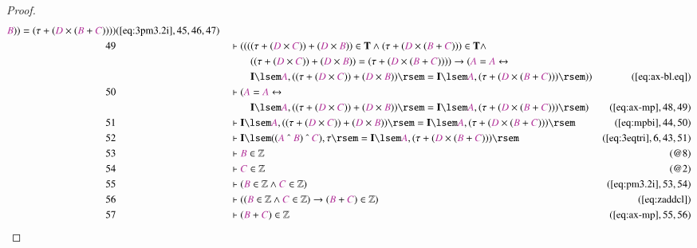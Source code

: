 \begin{proof}
\begin{align}
      \mc{B} ) ) = ( \tau + ( \mc{D} \times ( \mc{B} +
      \mc{C} ) ) )
      )&(\mbox{\ref{eq:3pm3.2i}},45,46,47)\notag
  \\ 49 &&  & \vdash ( ( ( ( \tau + ( \mc{D} \times \mc{C} ) ) + ( \mc{D} \times
      \mc{B} ) ) \in \mathbf{T} \wedge ( \tau + ( \mc{D}
      \times ( \mc{B} + \mc{C} ) ) ) \in \mathbf{T} \wedge  \notag \\ & & & \qquad
      (
      ( \tau + ( \mc{D} \times \mc{C} ) ) + ( \mc{D} \times
      \mc{B} ) ) = ( \tau + ( \mc{D} \times ( \mc{B} +
      \mc{C} ) ) ) ) \rightarrow ( \mc{A} = \mc{A}
      \leftrightarrow \notag \\ & & & \qquad
       \mathbf{I} \lsem \mc{A} , ( ( \tau +
      ( \mc{D} \times \mc{C} ) ) + ( \mc{D} \times \mc{B} ) )
      \rsem = \mathbf{I} \lsem \mc{A} , ( \tau + ( \mc{D}
      \times ( \mc{B} + \mc{C} ) ) ) \rsem )
      )&(\mbox{\ref{eq:ax-bl.eq}})\notag
  \\ 50 &&  & \vdash ( \mc{A} = \mc{A} \leftrightarrow  \notag \\ & & & \qquad
      \mathbf{I} \lsem \mc{A}
      , ( ( \tau + ( \mc{D} \times \mc{C} ) ) + ( \mc{D}
      \times \mc{B} ) ) \rsem = \mathbf{I} \lsem \mc{A} , (
      \tau + ( \mc{D} \times ( \mc{B} + \mc{C} ) ) ) \rsem
      )&(\mbox{\ref{eq:ax-mp}},48,49)\notag
  \\ 51 &&  & \vdash \mathbf{I} \lsem \mc{A} , ( ( \tau + ( \mc{D} \times \mc{C}
      ) ) + ( \mc{D} \times \mc{B} ) ) \rsem = \mathbf{I}
      \lsem \mc{A} , ( \tau + ( \mc{D} \times ( \mc{B} +
      \mc{C} ) ) ) \rsem&(\mbox{\ref{eq:mpbi}},44,50)\notag
  \\ 52 &&  & \vdash \mathbf{I} \lsem ( ( \mc{A} ~\string^~ \mc{B} ) ~\string^~
      \mc{C} ) , \tau \rsem = \mathbf{I} \lsem \mc{A} , (
      \tau + ( \mc{D} \times ( \mc{B} + \mc{C} ) ) )
      \rsem&(\mbox{\ref{eq:3eqtri}},6,43,51)\notag
  \\ 53 &&  & \vdash \mc{B} \in \mathbb{Z}&(@8)\notag
  \\ 54 &&  & \vdash \mc{C} \in \mathbb{Z}&(@2)\notag
  \\ 55 &&  & \vdash ( \mc{B} \in \mathbb{Z} \wedge \mc{C} \in \mathbb{Z}
      )&(\mbox{\ref{eq:pm3.2i}},53,54)\notag
  \\ 56 &&  & \vdash ( ( \mc{B} \in \mathbb{Z} \wedge \mc{C} \in \mathbb{Z} )
      \rightarrow ( \mc{B} + \mc{C} ) \in \mathbb{Z}
      )&(\mbox{\ref{eq:zaddcl}})\notag
  \\ 57 &&  & \vdash ( \mc{B} + \mc{C} ) \in
      \mathbb{Z}&(\mbox{\ref{eq:ax-mp}},55,56)\notag

\end{align}
\end{proof}
